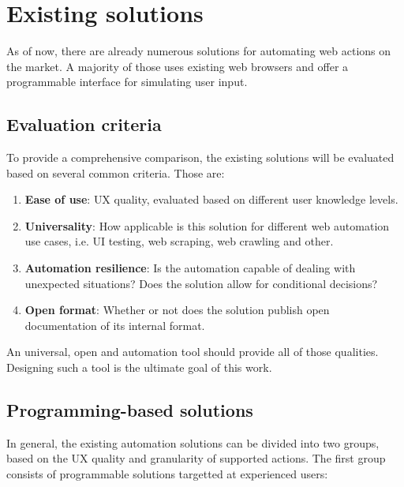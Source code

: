 
\section{Existing solutions}
\label{competition}
As of now, there are already numerous solutions for automating web actions on the market. 
A majority of those uses existing web browsers and offer a programmable interface for simulating user input.

\subsection{Evaluation criteria}
To provide a comprehensive comparison, the existing solutions will be evaluated based on several common criteria. Those are:
\begin{enumerate}
    \item \textbf{Ease of use}: \Ac{UX} quality, evaluated based on different user knowledge levels.
    \item \textbf{Universality}: How applicable is this solution for different web automation use cases, i.e. \ac{UI} testing, web scraping, web crawling and other.
    \item \textbf{Automation resilience}: Is the automation capable of dealing with unexpected situations? Does the solution allow for conditional decisions?
    \item \textbf{Open format}: Whether or not does the solution publish open documentation of its internal format.
\end{enumerate}

An universal, open and automation tool should provide all of those qualities. 
Designing such a tool is the ultimate goal of this work.

\subsection{Programming-based solutions}

In general, the existing automation solutions can be divided into two groups, based on the \ac{UX} quality and granularity of supported actions. 
The first group consists of programmable solutions targetted at experienced users:

\emptyline

